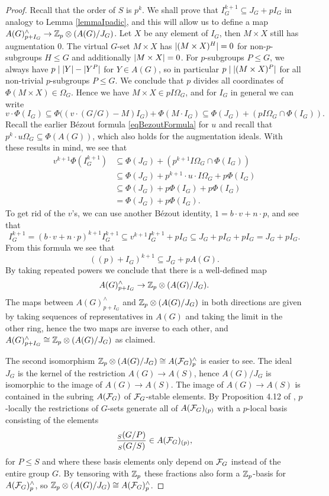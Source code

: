 \documentclass[10pt]{amsart}
\theoremstyle{definition}
\DeclarePairedDelimiter{\abs}{\lvert}{\rvert}
\begin{document}
\begin{proof}
Recall that the order of $S$ is $p^k$. We shall prove that $I_G^{k+1} \subseteq J_G + pI_G$ in analogy to Lemma \ref{lemmaIpadic}, and this will allow us to define a map $A(G)^\wedge_{p+I_G} \to \mathbb{Z}_p\otimes (A(G)/J_G)$.
Let $X$ be any element of $I_G$, then $M\times X$ still has augmentation $0$. The virtual $G$-set $M\times X$ has $\abs{(M\times X)^H}=0$ for non-$p$-subgroups $H\leq G$ and additionally $\abs{M\times X}=0$. For $p$-subgroups $P\leq G$, we always have $p\mid \abs{Y} - \abs{Y^P}$ for $Y\in A(G)$, so in particular $p\mid \abs{(M\times X)^P}$ for all non-trivial $p$-subgroups $P\leq G$. We conclude that $p$ divides all coordinates of $\Phi(M\times X)\in \Omega_G$. Hence we have $M\times X\in pI\Omega_G$, and for $I_G$ in general we can write
\[v\cdot \Phi(I_G) \subseteq \Phi\bigl((v\cdot (G/G)-M)I_G\bigr) + \Phi(M\cdot I_G) \subseteq \Phi(J_G) + (pI\Omega_G \cap \Phi(I_G)).\]
Recall the earlier B{\'e}zout formula \eqref{eqBezoutFormula} for $u$ and recall that $p^k\cdot u \Omega_G \subseteq \Phi(A(G))$, which also holds for the augmentation ideals. With these results in mind, we see that
\begin{align*}
v^{k+1} \Phi(I_G^{k+1}) &\subseteq \Phi(J_G) + (p^{k+1} I\Omega_G \cap \Phi(I_G))
\\ &\subseteq \Phi(J_G) + p^{k+1}\cdot u\cdot I\Omega_G + p \Phi(I_G)
\\ &\subseteq \Phi(J_G) + p \Phi(I_G) + p\Phi(I_G)
\\ &=  \Phi(J_G) + p \Phi(I_G).
\end{align*}
To get rid of the $v$'s, we can use another B{\'e}zout identity, $1= b\cdot v + n\cdot p$, and see that
\[I_G^{k+1} = (b\cdot v+ n\cdot p)^{k+1} I_G^{k+1} \subseteq v^{k+1} I_G^{k+1} + p I_G \subseteq J_G + p I_G + pI_G = J_G + p I_G.\]
From this formula we see that
\[((p)+I_G)^{k+1} \subseteq J_G + p A(G).\]
By taking repeated powers we conclude that there is a well-defined map
\[A(G)^\wedge_{p+I_G} \to \mathbb{Z}_p\otimes (A(G)/J_G).\]
The maps between $A(G)^\wedge_{p+I_G}$ and $\mathbb{Z}_p\otimes (A(G)/J_G)$ in both directions are given by taking sequences of representatives in $A(G)$ and taking the limit in the other ring, hence the two maps are inverse to each other, and $A(G)^\wedge_{p+I_G}\cong\mathbb{Z}_p\otimes (A(G)/J_G)$ as claimed.

The second isomorphism $\mathbb{Z}_p\otimes (A(G)/J_G)\cong A(\mathcal{F}_G)^\wedge_p$ is easier to see. The ideal $J_G$ is the kernel of the restriction $A(G)\to A(S)$, hence $A(G)/J_G$ is isomorphic to the image of $A(G)\to A(S)$. The image of $A(G)\to A(S)$ is contained in the subring $A(\mathcal{F}_G)$ of $\mathcal{F}_G$-stable elements. By Proposition 4.12 of \cite{ReehIdempotent}, $p$-locally the restrictions of $G$-sets generate all of $A(\mathcal{F}_G)_{(p)}$ with a $p$-local basis consisting of the elements 
\[\frac{{}_S (G/P)}{{}_S (G/S)} \in A(\mathcal{F}_G)_{(p)},\]
for $P\leq S$ and where these basis elements only depend on $\mathcal{F}_G$ instead of the entire group $G$. By tensoring with $\mathbb{Z}_p$ these fractions also form a $\mathbb{Z}_p$-basis for $A(\mathcal{F}_G)^\wedge_p$, so $\mathbb{Z}_p\otimes (A(G)/J_G) \cong A(\mathcal{F}_G)^\wedge_p$.
\end{proof} 
\end{document}
